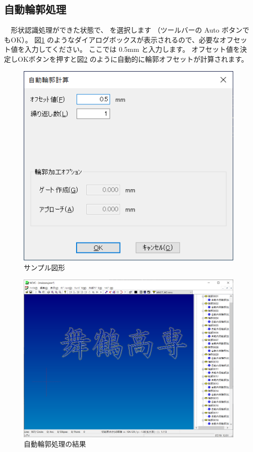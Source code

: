 

\subsection{自動輪郭処理}

\begin{minipage}[t]{0.5\textwidth}
　形状認識処理ができた状態で、 を選択します
（ツールバーの Auto ボタンでもOK）。
図\ref{fig:auto.png} のようなダイアログボックスが表示されるので、必要なオフセット値を入力してください。
ここでは 0.5mm と入力します。
オフセット値を決定しOKボタンを押すと図\ref{fig:maizuru3.png} のように自動的に輪郭オフセットが計算されます。
\end{minipage}
\begin{minipage}[t]{0.5\textwidth}
\vspace*{-2zh}
\begin{figure}[H]
\centering
\includegraphics[scale=0.7]{No2/fig/auto.png}
\caption{サンプル図形}
\label{fig:auto.png}
\end{figure}
\end{minipage}

\begin{figure}[H]
\centering
\includegraphics[scale=0.55]{No2/fig/maizuru3.png}
\caption{自動輪郭処理の結果}
\label{fig:maizuru3.png}
\end{figure}
